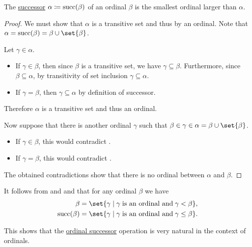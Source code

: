 \begin{proposition}\label{thm:successor_of_ordinal}
  The \hyperref[def:ordinal_successor]{successor} \( \alpha \coloneqq \operatorname{succ}(\beta) \) of an ordinal \( \beta \) is the smallest ordinal larger than \( \alpha \).
\end{proposition}
\begin{proof}
  We must show that \( \alpha \) is a transitive set and thus by  an ordinal. Note that \( \alpha = \op{succ}(\beta) = \beta \cup \set{ \beta } \).

  Let \( \gamma \in \alpha \).
  \begin{itemize}
    \item If \( \gamma \in \beta \), then since \( \beta \) is a transitive set, we have \( \gamma \subseteq \beta \). Furthermore, since \( \beta \subseteq \alpha \), by transitivity of set inclusion \( \gamma \subseteq \alpha \).

    \item If \( \gamma = \beta \), then \( \gamma \subseteq \alpha \) by definition of successor.
  \end{itemize}

  Therefore \( \alpha \) is a transitive set and thus an ordinal.

  Now suppose that there is another ordinal \( \gamma \) such that \( \beta \in \gamma \in \alpha = \beta \cup \set{ \beta } \).
  \begin{itemize}
    \item If \( \gamma \in \beta \), this would contradict .

    \item If \( \gamma = \beta \), this would contradict .
  \end{itemize}

  The obtained contradictions show that there is no ordinal between \( \alpha \) and \( \beta \).
\end{proof}

\begin{remark}\label{rem:def:ordinal_successor}
  It follows from  and  and that for any ordinal \( \beta \) we have
  \begin{align*}
    \beta            &= \set{ \gamma \given \gamma \T{is an ordinal and} \gamma < \beta }, \\
    \op{succ}(\beta) &= \set{ \gamma \given \gamma \T{is an ordinal and} \gamma \leq \beta }.
  \end{align*}

  This shows that the \hyperref[def:ordinal_successor]{ordinal successor} operation is very natural in the context of ordinals.
\end{remark}

